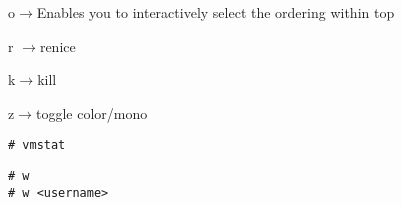 \documentclass[9pt]{amsart}
\newcommand{\filldots}{\noindent \textbf {\textcolor {blue} {\dotfill}} }
\begin{document}
\begin{multicols}{2}
o$\to$Enables you to interactively select the ordering within top

r $\to$renice

k$\to$kill

z$\to$toggle color/mono

\noindent {\textcolor {blue} {\em System Activity, Hardware and System Information}} 

\begin{lstlisting}
# vmstat
\end{lstlisting}

\noindent {\textcolor {blue} {\em Find Out Who Is Logged on And What They Are Doing}} 

\begin{lstlisting}
# w
# w <username>
\end{lstlisting}

\filldots 


\end{multicols}
\end{document}
